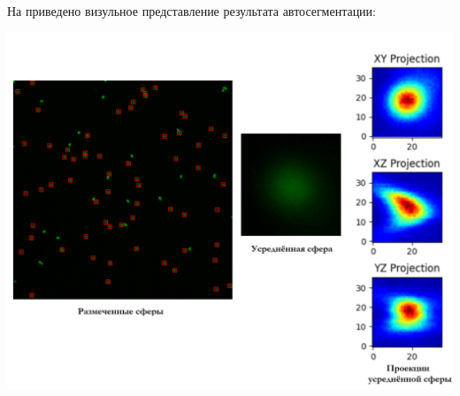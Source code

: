 \par На  приведено визульное представление результата автосегментации:\\
\noindent %
\begin{minipage}{\textwidth}
	\centering
	\vspace{\mfloatsep} %
	\includegraphics[keepaspectratio=true,scale=0.57] {my_folder/images/autosegm/autosegm_res.png}
	\label{fig:autosegm-res}  
	\vspace{\mfloatsep} %
\end{minipage}

